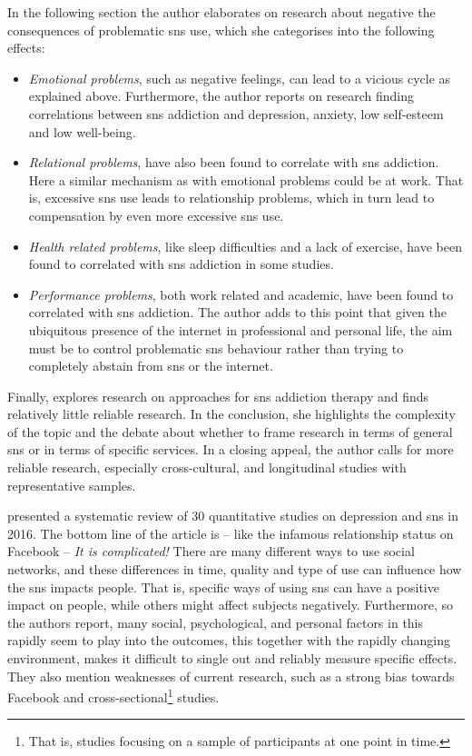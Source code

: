 In the following section the author elaborates on research about negative the consequences of problematic \gls{sns} use, which she categorises into the following effects:
\begin{itemize}
    \item \emph{Emotional problems}, such as negative feelings, can lead to a vicious cycle as explained above. Furthermore, the author reports on research finding correlations between \gls{sns} addiction and depression, anxiety, low self-esteem and low well-being.
    \item \emph{Relational problems}, have also been found to correlate with \gls{sns} addiction. Here a similar mechanism as with emotional problems could be at work. That is, excessive \gls{sns} use leads to relationship problems, which in turn lead to compensation by even more excessive \gls{sns} use.
    \item \emph{Health related problems}, like sleep difficulties and a lack of exercise, have been found to correlated with \gls{sns} addiction in some studies. 
    \item \emph{Performance problems}, both work related and academic, have been found to correlated with \gls{sns} addiction. The author adds to this point that given the ubiquitous presence of the internet in professional and personal life, the aim must be to control problematic \gls{sns} behaviour rather than trying to completely abstain from \gls{sns} or the internet.
\end{itemize}

Finally, \citet{andreassen_online_2015} explores research on approaches for \gls{sns} addiction therapy and finds relatively little reliable research.
In the conclusion, she highlights the complexity of the topic and the debate about whether to frame research in terms of general \gls{sns} or in terms of specific services.
In a closing appeal, the author calls for more reliable research, especially cross-cultural, and longitudinal studies with representative samples. 

\citet{baker_relationship_2016} presented a systematic review of 30 quantitative studies on depression and \gls{sns} in 2016.
The bottom line of the article is -- like the infamous relationship status on Facebook -- \emph{It is complicated!} There are many different ways to use social networks, and these differences in time, quality and type of use can influence how the \gls{sns} impacts people. 
That is, specific ways of using \gls{sns} can have a positive impact on people, while others might affect subjects negatively. 
Furthermore, so the authors report, many social, psychological, and personal factors in this rapidly seem to play into the outcomes, this together with the rapidly changing environment, makes it difficult to single out and reliably measure specific effects.
They also mention weaknesses of current research, such as a strong bias towards Facebook and cross-sectional\footnote{That is, studies focusing on a sample of participants at one point in time.} studies.

